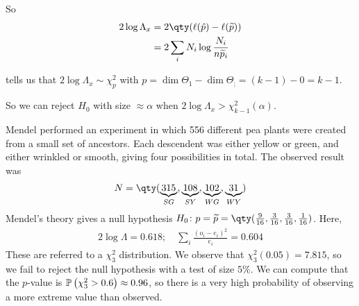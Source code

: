 So 
\begin{align*}
	2 \log \Lambda_x &= 2\qty(\ell(\hat p) - \ell(\widetilde p)) \\
	&= 2 \sum_i N_i \log \frac{N_i}{n \widetilde{p}_i}
\end{align*}

 tells us that $2 \log \Lambda_x \sim \chi_p^2$ with $p = \dim \Theta_1 - \dim \Theta_; = (k - 1) - 0 = k - 1$.

So we can reject $H_0$ with size $\approx \alpha$ when $2 \log \Lambda_x > \chi_{k - 1}^2(\alpha)$.

\begin{example} \label{exm:mendel}
	Mendel performed an experiment in which 556 different pea plants were created from a small set of ancestors.
	Each descendent was either yellow or green, and either wrinkled or smooth, giving four possibilities in total.
	The observed result was
	\begin{align*}
		N = \qty(\underbrace{315}_{SG}, \underbrace{108}_{SY}, \underbrace{102}_{WG}, \underbrace{31}_{WY})
	\end{align*}
	Mendel's theory gives a null hypothesis $H_0 \colon p = \widetilde p = \qty(\frac{9}{16}, \frac{3}{16}, \frac{3}{16}, \frac{1}{16})$.
	Here,
	\begin{align*}
		2 \log \Lambda = 0.618;\quad \sum_i \frac{(o_i - e_i)^2}{e_i} = 0.604
	\end{align*}
	These are referred to a $\chi^2_3$ distribution.
	We observe that $\chi^2_3(0.05) = 7.815$, so we fail to reject the null hypothesis with a test of size $5\%$.
	We can compute that the $p$-value is $\mathbb{P}\left({\chi^2_3 > 0.6}\right) \approx 0.96$, so there is a very high probability of observing a more extreme value than observed.
\end{example}


